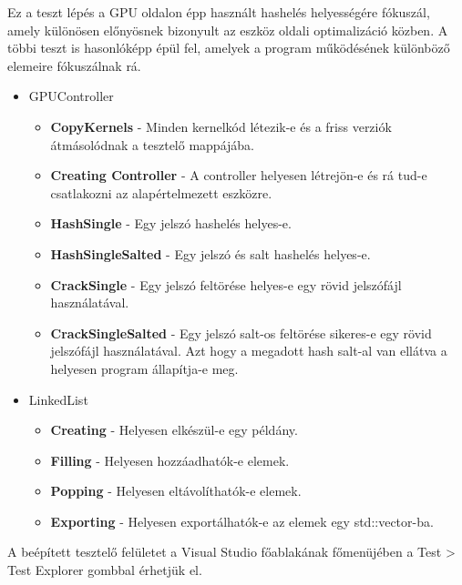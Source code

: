 Ez a teszt lépés a GPU oldalon épp használt hashelés helyességére fókuszál, amely különösen előnyösnek bizonyult az eszköz oldali optimalizáció közben. A többi teszt is hasonlóképp épül fel, amelyek a program működésének különböző elemeire fókuszálnak rá.
%
\begin{itemize}
    \itemsep-0.5em
    \item GPUController
        \begin{itemize}
            \item \textbf{CopyKernels} - Minden kernelkód létezik-e és a friss verziók átmásolódnak a tesztelő mappájába.
            \item \textbf{Creating Controller} - A controller helyesen létrejön-e és rá tud-e csatlakozni az alapértelmezett eszközre.
            \item \textbf{HashSingle} - Egy jelszó hashelés helyes-e.
            \item \textbf{HashSingleSalted} - Egy jelszó és salt hashelés helyes-e.
            \item \textbf{CrackSingle} - Egy jelszó feltörése helyes-e egy rövid jelszófájl használatával.
            \item \textbf{CrackSingleSalted} - Egy jelszó salt-os feltörése sikeres-e egy rövid jelszófájl használatával. Azt hogy a megadott hash salt-al van ellátva a helyesen program állapítja-e meg.
        \end{itemize}
    \item LinkedList
    \begin{itemize}
            \item \textbf{Creating} - Helyesen elkészül-e egy példány.
            \item \textbf{Filling} - Helyesen hozzáadhatók-e elemek.
            \item \textbf{Popping} - Helyesen eltávolíthatók-e elemek.
            \item \textbf{Exporting} - Helyesen exportálhatók-e az elemek egy std::vector-ba.
        \end{itemize}
\end{itemize}

A beépített tesztelő felületet a Visual Studio főablakának főmenüjében a Test > Test Explorer gombbal érhetjük el.

